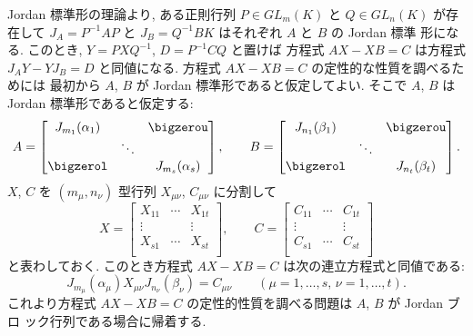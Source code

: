 \documentclass[12pt,twoside]{jarticle}
\begin{document}

Jordan 標準形の理論より, ある正則行列 $P\in GL_m(K)$ と $Q\in GL_n(K)$ が存
在して $J_A=P^{-1}AP$ と $J_B=Q^{-1}BK$ はそれぞれ $A$ と $B$ の Jordan 標準
形になる.  このとき, $Y=PXQ^{-1}$, $D=P^{-1}CQ$ と置けば
方程式 $AX-XB=C$ は方程式 $J_AY-YJ_B=D$ と同値になる.
方程式 $AX-XB=C$ の定性的な性質を調べるためには
最初から $A$, $B$ が Jordan 標準形であると仮定してよい.
そこで $A$, $B$ は Jordan 標準形であると仮定する:
\begin{equation*}
  A = 
  \begin{bmatrix}
    J_{m_1}(\alpha_1) &        & \bigzerou \\
                      & \ddots & \\
    \bigzerol         &        & J_{m_s}(\alpha_s) \\
  \end{bmatrix},
  \qquad
  B = 
  \begin{bmatrix}
    J_{n_1}(\beta_1) &        & \bigzerou \\
                     & \ddots & \\
    \bigzerol        &        & J_{n_t}(\beta_t) \\
  \end{bmatrix}.
\end{equation*}
$X$, $C$ を $(m_\mu,n_\nu)$ 型行列 $X_{\mu\nu}$, $C_{\mu\nu}$ に分割して
\begin{equation*}
  X = 
  \begin{bmatrix}
    X_{11} & \cdots & X_{1t} \\
    \vdots &        & \vdots \\
    X_{s1} & \cdots & X_{st} \\
  \end{bmatrix},
  \qquad
  C = 
  \begin{bmatrix}
    C_{11} & \cdots & C_{1t} \\
    \vdots &        & \vdots \\
    C_{s1} & \cdots & C_{st} \\
  \end{bmatrix}
\end{equation*}
と表わしておく.  このとき方程式 $AX-XB=C$ は次の連立方程式と同値である:
\begin{equation*}
  J_{m_\mu}(\alpha_\mu)X_{\mu\nu}J_{n_\nu}(\beta_\nu) = C_{\mu\nu}
  \qquad (\mu=1,\dots,s,\, \nu=1,\dots,t).
\end{equation*}
これより方程式 $AX-XB=C$ の定性的性質を調べる問題は $A$, $B$ が Jordan ブロ
ック行列である場合に帰着する.
\end{document}
